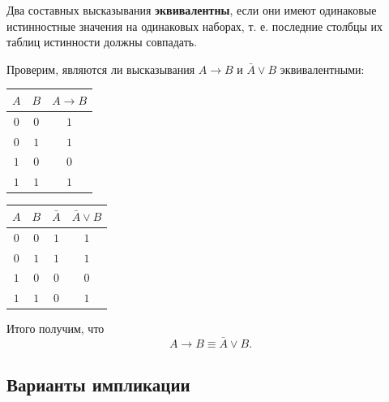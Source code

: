 Два составных высказывания \textbf{эквивалентны}, если они имеют одинаковые истинностные значения на одинаковых наборах, т. е. последние столбцы их таблиц истинности должны совпадать.

\begin{example*}
    Проверим, являются ли высказывания \(A \to B\) и \(\bar{A} \lor B\) эквивалентными:

    \begin{minipage}[c]{0.5\textwidth}
        \renewcommand*{\arraystretch}{1.5}
        \begin{longtable}{|c|c|c|}
            \hline
            \(A\) & \(B\) & \(A \to B\) \\
            \hline
            \(0\) & \(0\) & \(1\)       \\
            \hline
            \(0\) & \(1\) & \(1\)       \\
            \hline
            \(1\) & \(0\) & \(0\)       \\
            \hline
            \(1\) & \(1\) & \(1\)       \\
            \hline
        \end{longtable}
    \end{minipage}
    \begin{minipage}[c]{0.5\textwidth}
        \renewcommand*{\arraystretch}{1.5}
        \begin{longtable}{|c|c|c|c|}
            \hline
            \(A\) & \(B\) & \(\bar{A}\) & \(\bar{A} \lor B\) \\
            \hline
            \(0\) & \(0\) & \(1\)       & \(1\)              \\
            \hline
            \(0\) & \(1\) & \(1\)       & \(1\)              \\
            \hline
            \(1\) & \(0\) & \(0\)       & \(0\)              \\
            \hline
            \(1\) & \(1\) & \(0\)       & \(1\)              \\
            \hline
        \end{longtable}
    \end{minipage}

    \vspace*{1em}

    Итого получим, что
    \[
        A \to B \equiv \bar{A} \lor B.
    \]
\end{example*}

\subsection{Варианты импликации}


